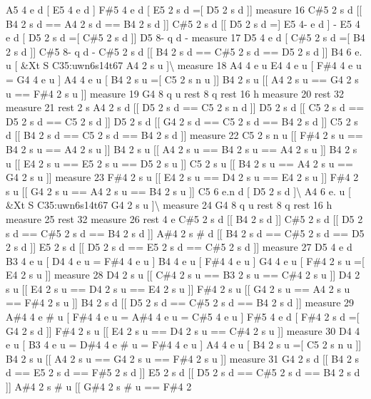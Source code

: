 A5 4 e d \mbox{[} E5 4 e d \mbox{]} F\#5 4 e d \mbox{[} E5 2 s d =\mbox{[} D5 2 s d \mbox{]}\mbox{]} measure 16 C\#5 2 s d \mbox{[}\mbox{[} B4 2 s d == A4 2 s d == B4 2 s d \mbox{]}\mbox{]} C\#5 2 s d \mbox{[}\mbox{[} D5 2 s d =\mbox{]} E5 4-\/ e d \mbox{]} -\/ E5 4 e d \mbox{[} D5 2 s d =\mbox{[} C\#5 2 s d \mbox{]}\mbox{]} D5 8-\/ q d -\/ measure 17 D5 4 e d \mbox{[} C\#5 2 s d =\mbox{[} B4 2 s d \mbox{]}\mbox{]} C\#5 8-\/ q d -\/ C\#5 2 s d \mbox{[}\mbox{[} B4 2 s d == C\#5 2 s d == D5 2 s d \mbox{]}\mbox{]} B4 6 e. u \mbox{[} \&Xt S C35\+:uwn6s14t67 A4 2 s u \mbox{]}\textbackslash{} measure 18 A4 4 e u E4 4 e u \mbox{[} F\#4 4 e u = G4 4 e u \mbox{]} A4 4 e u \mbox{[} B4 2 s u =\mbox{[} C5 2 s n u \mbox{]}\mbox{]} B4 2 s u \mbox{[}\mbox{[} A4 2 s u == G4 2 s u == F\#4 2 s u \mbox{]}\mbox{]} measure 19 G4 8 q u rest 8 q rest 16 h measure 20 rest 32 measure 21 rest 2 s A4 2 s d \mbox{[}\mbox{[} D5 2 s d == C5 2 s n d \mbox{]}\mbox{]} D5 2 s d \mbox{[}\mbox{[} C5 2 s d == D5 2 s d == C5 2 s d \mbox{]}\mbox{]} D5 2 s d \mbox{[}\mbox{[} G4 2 s d == C5 2 s d == B4 2 s d \mbox{]}\mbox{]} C5 2 s d \mbox{[}\mbox{[} B4 2 s d == C5 2 s d == B4 2 s d \mbox{]}\mbox{]} measure 22 C5 2 s n u \mbox{[}\mbox{[} F\#4 2 s u == B4 2 s u == A4 2 s u \mbox{]}\mbox{]} B4 2 s u \mbox{[}\mbox{[} A4 2 s u == B4 2 s u == A4 2 s u \mbox{]}\mbox{]} B4 2 s u \mbox{[}\mbox{[} E4 2 s u == E5 2 s u == D5 2 s u \mbox{]}\mbox{]} C5 2 s u \mbox{[}\mbox{[} B4 2 s u == A4 2 s u == G4 2 s u \mbox{]}\mbox{]} measure 23 F\#4 2 s u \mbox{[}\mbox{[} E4 2 s u == D4 2 s u == E4 2 s u \mbox{]}\mbox{]} F\#4 2 s u \mbox{[}\mbox{[} G4 2 s u == A4 2 s u == B4 2 s u \mbox{]}\mbox{]} C5 6 e.\+n d \mbox{[} D5 2 s d \mbox{]}\textbackslash{} A4 6 e. u \mbox{[} \&Xt S C35\+:uwn6s14t67 G4 2 s u \mbox{]}\textbackslash{} measure 24 G4 8 q u rest 8 q rest 16 h measure 25 rest 32 measure 26 rest 4 e C\#5 2 s d \mbox{[}\mbox{[} B4 2 s d \mbox{]}\mbox{]} C\#5 2 s d \mbox{[}\mbox{[} D5 2 s d == C\#5 2 s d == B4 2 s d \mbox{]}\mbox{]} A\#4 2 s \# d \mbox{[}\mbox{[} B4 2 s d == C\#5 2 s d == D5 2 s d \mbox{]}\mbox{]} E5 2 s d \mbox{[}\mbox{[} D5 2 s d == E5 2 s d == C\#5 2 s d \mbox{]}\mbox{]} measure 27 D5 4 e d B3 4 e u \mbox{[} D4 4 e u = F\#4 4 e u \mbox{]} B4 4 e u \mbox{[} F\#4 4 e u \mbox{]} G4 4 e u \mbox{[} F\#4 2 s u =\mbox{[} E4 2 s u \mbox{]}\mbox{]} measure 28 D4 2 s u \mbox{[}\mbox{[} C\#4 2 s u == B3 2 s u == C\#4 2 s u \mbox{]}\mbox{]} D4 2 s u \mbox{[}\mbox{[} E4 2 s u == D4 2 s u == E4 2 s u \mbox{]}\mbox{]} F\#4 2 s u \mbox{[}\mbox{[} G4 2 s u == A4 2 s u == F\#4 2 s u \mbox{]}\mbox{]} B4 2 s d \mbox{[}\mbox{[} D5 2 s d == C\#5 2 s d == B4 2 s d \mbox{]}\mbox{]} measure 29 A\#4 4 e \# u \mbox{[} F\#4 4 e u = A\#4 4 e u = C\#5 4 e u \mbox{]} F\#5 4 e d \mbox{[} F\#4 2 s d =\mbox{[} G4 2 s d \mbox{]}\mbox{]} F\#4 2 s u \mbox{[}\mbox{[} E4 2 s u == D4 2 s u == C\#4 2 s u \mbox{]}\mbox{]} measure 30 D4 4 e u \mbox{[} B3 4 e u = D\#4 4 e \# u = F\#4 4 e u \mbox{]} A4 4 e u \mbox{[} B4 2 s u =\mbox{[} C5 2 s n u \mbox{]}\mbox{]} B4 2 s u \mbox{[}\mbox{[} A4 2 s u == G4 2 s u == F\#4 2 s u \mbox{]}\mbox{]} measure 31 G4 2 s d \mbox{[}\mbox{[} B4 2 s d == E5 2 s d == F\#5 2 s d \mbox{]}\mbox{]} E5 2 s d \mbox{[}\mbox{[} D5 2 s d == C\#5 2 s d == B4 2 s d \mbox{]}\mbox{]} A\#4 2 s \# u \mbox{[}\mbox{[} G\#4 2 s \# u == F\#4 2 